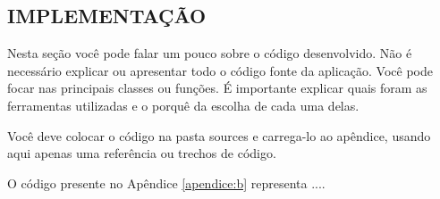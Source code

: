

\subsection{IMPLEMENTAÇÃO}

Nesta seção você pode falar um pouco sobre o código desenvolvido. Não é necessário explicar ou apresentar todo o código fonte da aplicação. Você pode focar nas principais classes ou funções. É importante explicar quais foram as ferramentas utilizadas e o porquê da escolha de cada uma delas.

Você deve colocar o código na pasta sources e carrega-lo ao apêndice, usando aqui apenas uma referência ou trechos de código.

O código presente no Apêndice \ref{apendice:b} representa ....